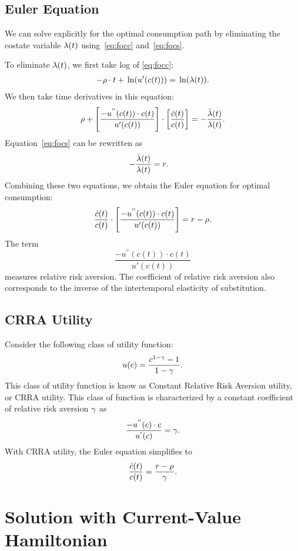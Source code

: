\documentclass[letterpaper,12pt,leqno]{article}
\begin{document}
\subsection{Euler Equation} 

We can solve explicitly for the optimal consumption path by eliminating the costate variable $\lambda(t)$ using~\eqref{eq:focc} and~\eqref{eq:focs}. 

To eliminate $\lambda(t)$, we first take log of \eqref{eq:focc}:
\begin{align*}
-\r \cdot t+ \ln{u'(c(t))} =\ln{\l(t)}.
\end{align*}
We then take time derivatives in this equation:
\begin{equation*}
\rho+\left[  \frac{-u^{''}(c(t)) \cdot c(t)}{u'(c(t))} \right]\cdot \left[ \frac{\dot{c}(t)}{c(t)} \right] =-\frac{\dot{\lambda}(t)}{\lambda(t)}.
\end{equation*}
Equation~\eqref{eq:focs} can be rewritten as
\begin{align*}
-\frac{\dot{\lambda}(t)}{\lambda(t)}&=  r.
\end{align*}
Combining these two equations, we obtain the Euler equation for optimal consumption:
\begin{equation}
\frac{\dot{c}(t)}{c(t)}\cdot \left[ \frac{-u^{''}(c(t)) \cdot c(t)}{u'(c(t)) } \right] =r-\rho.
\label{eq:EULER}\end{equation}
The term \[\frac{-u^{''}(c(t))\cdot  c(t)}{u'(c(t))}\] measures relative risk aversion. The coefficient of relative risk aversion also corresponds to the inverse of the intertemporal elasticity of substitution.

\subsection{CRRA Utility}

Consider the following class of utility function:
\begin{equation*}
u(c) =\frac{c^{1-\gamma }-1}{1-\gamma }.
\end{equation*}
This class of utility function is know as Constant Relative Risk Aversion utility, or CRRA utility. This class of function is characterized by a constant coefficient of relative risk aversion $\gamma$ as
\[\frac{-u^{''}(c) \cdot  c}{u^{'}(c)}=\gamma.\]
With CRRA utility, the Euler equation simplifies to
\begin{equation*}
\frac{\dot{c}(t)}{c(t)}=\frac{r-\rho}{\gamma}.
\end{equation*}

\section{Solution with Current-Value Hamiltonian}
\end{document}
